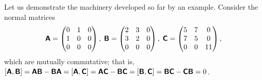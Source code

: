{%
Let us demonstrate the machinery developed so far by an example.
Consider the normal matrices
$$
\textsf{\textbf{A}} = %
\begin{pmatrix}
0& 1& 0\\ 1& 0& 0\\ 0& 0& 0
\end{pmatrix},\;
\textsf{\textbf{B}} = %
\begin{pmatrix}
2& 3& 0\\ 3& 2& 0\\ 0& 0& 0
\end{pmatrix},\;
\textsf{\textbf{C}} = %
\begin{pmatrix}
5& 7& 0\\ 7& 5& 0\\ 0& 0& 11
\end{pmatrix},
$$
which are mutually commutative; that is,
$
[\textsf{\textbf{A}}, \textsf{\textbf{B}}]=
\textsf{\textbf{A}} \textsf{\textbf{B}}-\textsf{\textbf{B}}\textsf{\textbf{A}}=
[\textsf{\textbf{A}}, \textsf{\textbf{C}}]=
\textsf{\textbf{A}} \textsf{\textbf{C}}-\textsf{\textbf{B}}\textsf{\textbf{C}}=
[\textsf{\textbf{B}}, \textsf{\textbf{C}}]=
\textsf{\textbf{B}} \textsf{\textbf{C}}-\textsf{\textbf{C}}\textsf{\textbf{B}}=0$.

}
